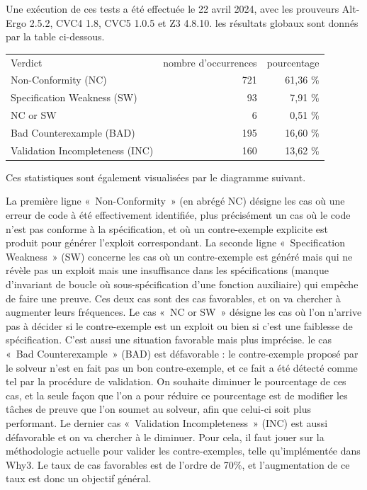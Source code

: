 \documentclass[a4paper,11pt]{article}
\begin{document}
Une exécution de ces tests a été effectuée
le 22 avril 2024, avec les prouveurs Alt-Ergo 2.5.2, CVC4 1.8, CVC5
1.0.5 et Z3 4.8.10. les résultats globaux sont donnés par la table ci-dessous.
  \begin{center}
  \begin{tabular}{|l|r|r|}
    \hline
  \rowcolor{gray!50} Verdict
  & \multicolumn{1}{p{0.13\textwidth}|}{nombre d'occurrences}
  & \multicolumn{1}{p{0.13\textwidth}|}{pourcentage}
  \\
Non-Conformity (NC)         & 721 & 61,36 \% \\
Specification Weakness (SW) & 93 & 7,91 \% \\
NC or SW  	       & 6 & 0,51 \% \\
Bad Counterexample (BAD) & 195 & 16,60 \% \\
    Validation Incompleteness (INC) & 160 & 13,62 \% \\
    \hline
  \end{tabular}
\end{center}
Ces statistiques sont également visualisées par le diagramme
  suivant.
  \begin{center}
\end{center}
La première ligne «~Non-Conformity~» (en abrégé NC) désigne les cas où une
erreur de code à été effectivement identifiée, plus précisément un cas où le
code n'est pas conforme à la spécification, et où un contre-exemple explicite
est produit pour générer l'exploit correspondant. La seconde ligne
«~Specification Weakness~» (SW) concerne les cas où un contre-exemple est généré
mais qui ne révèle pas un exploit mais une insuffisance dans les spécifications
(manque d'invariant de boucle où sous-spécification d'une fonction auxiliaire)
qui empêche de faire une preuve. Ces deux cas sont des cas favorables, et on va
chercher à augmenter leurs fréquences. Le cas «~NC or SW~» désigne les cas où l'on
n'arrive pas à décider si le contre-exemple est un exploit ou bien si c'est une
faiblesse de spécification. C'est aussi une situation favorable mais plus
imprécise. le cas «~Bad Counterexample~» (BAD) est défavorable : le contre-exemple
proposé par le solveur n'est en fait pas un bon contre-exemple, et ce fait a été
détecté comme tel par la procédure de validation. On souhaite diminuer le
pourcentage de ces cas, et la seule façon que l'on a pour réduire ce pourcentage
est de modifier les tâches de preuve que l'on soumet au solveur, afin que
celui-ci soit plus performant. Le dernier cas «~Validation Incompleteness~»
(INC) est aussi défavorable et on va chercher à le diminuer. Pour cela, il faut
jouer sur la méthodologie actuelle pour valider les contre-exemples, telle
qu'implémentée dans Why3.  Le taux de cas favorables est de l'ordre de 70\%, et
l'augmentation de ce taux est donc un objectif général.
\end{document}
